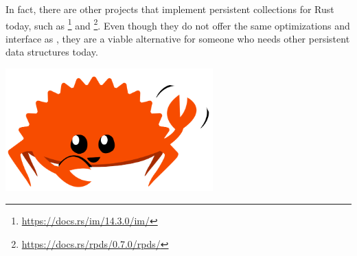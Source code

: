 In fact, there are other projects that implement persistent collections for Rust today, such as \imrs{}\footnote{\url{https://docs.rs/im/14.3.0/im/}} and \rpds{}\footnote{\url{https://docs.rs/rpds/0.7.0/rpds/}}. Even though they do not offer the same optimizations and interface as \pvecrs{}, they are a viable alternative for someone who needs other persistent data structures today.

\begin{center}
    \vspace*{6cm}
    \includegraphics[width=8cm, angle=0, trim=10 10 10 10, clip]{images/ferris-waving.png}
\end{center}
